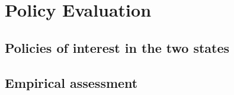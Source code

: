 \section{Policy Evaluation}
\subsection{Policies of interest in the two states}
\subsection{Empirical assessment}